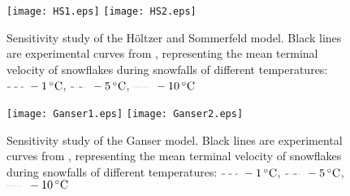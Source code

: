 		\begin{figure}
			\centering
			\texttt{[image: HS1.eps]}
			\texttt{[image: HS2.eps]}
			\caption[Sensitivity study of the H\"oltzer and Sommerfeld model.]{Sensitivity study of the H\"oltzer and Sommerfeld model. Black lines are experimental curves from \cite{BrandesIkedEtAl-2008}, representing the mean terminal velocity of snowflakes during snowfalls of different temperatures: 
			$ \tikz[baseline] {\draw[dashed] (0,.5ex)--(.5,.5ex) ;} ~\SI{-1}{\celsius} $,
			$ \tikz[baseline] {\draw[dash dot] (0,.5ex)--(.5,.5ex) ;} ~\SI{-5}{\celsius} $,
			$ \tikz[baseline] {\draw[dotted] (0,.5ex)--(.5,.5ex) ;} ~\SI{-10}{\celsius} $}
			\label{fig: sensitivityHS}
		\end{figure}	
	
		\begin{figure}
			\centering
			\texttt{[image: Ganser1.eps]}
			\texttt{[image: Ganser2.eps]}
			\caption[Sensitivity study of the Ganser model.]{Sensitivity study of the Ganser model. Black lines are experimental curves from \cite{BrandesIkedEtAl-2008}, representing the mean terminal velocity of snowflakes during snowfalls of different temperatures: 
				$ \tikz[baseline] {\draw[dashed] (0,.5ex)--(.5,.5ex) ;} ~\SI{-1}{\celsius} $,
				$ \tikz[baseline] {\draw[dash dot] (0,.5ex)--(.5,.5ex) ;} ~\SI{-5}{\celsius} $,
				$ \tikz[baseline] {\draw[dotted] (0,.5ex)--(.5,.5ex) ;} ~\SI{-10}{\celsius} $}
			\label{fig: sensitivityGanser}
		\end{figure}	
			
	
	
	
	
	
	
	
	
	
	
	
	
%		
		
